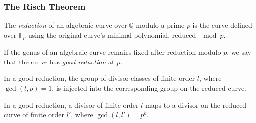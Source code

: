 \documentclass[aspectratio=169,dvipsnames]{beamer}
\begin{document}
\begin{frame}
\frametitle{The Risch Theorem}
\begin{definition}
The {\it reduction} of an algebraic curve over $\mathbb{Q}$ modulo a prime $p$
is the curve defined over $\mathbb{F}_p$ using the original curve's minimal
polynomial, reduced $\mod p$.
\end{definition}

\begin{definition}
If the genus of an algebraic curve remains fixed after reduction modulo $p$,
we say that the curve has {\it good reduction} at $p$.
\end{definition}

\begin{theorem}[Risch]
In a good reduction, the group of divisor classes of finite order $l$,
where $\gcd(l,p)=1$, is injected into the corresponding group on the
reduced curve.
\end{theorem}

\begin{corollary}
In a good reduction, a divisor of finite order $l$ maps to a
divisor on the reduced curve of finite order $l'$, where $\gcd(l,l') = p^k$.
\end{corollary}
\end{frame}

\begin{comment}

\begin{frame}[fragile]
\frametitle{Chebyshev's Integral (cont)}

\begin{sageblock}[chebyshev2]
PP.<x,y,z> = ProjectiveSpace(QQ, 2)
root = x^4+4*x^3+2*x^2+1
C = Curve((y^2-root).homogenize(z))
C.geometric_genus()
\end{sageblock}

\begin{sageblock}[chebyshev2]
PP.<x,y,z> = ProjectiveSpace(GF(2), 2)
C = Curve((y^2-root.change_ring(GF(2))).homogenize(z))
C.geometric_genus()
\end{sageblock}

\end{frame}

\begin{frame}[fragile]
\frametitle{Chebyshev's Integral (cont)}

\begin{sageblock}[chebyshev2]
PP.<x,y,z> = ProjectiveSpace(GF(3), 2)
C = Curve((y^2-root.change_ring(GF(3))).homogenize(z))
C.geometric_genus()
\end{sageblock}

\begin{sageblock}[chebyshev2]
PP.<x,y,z> = ProjectiveSpace(GF(5), 2)
C = Curve((y^2-root.change_ring(GF(5))).homogenize(z))
C.geometric_genus()
\end{sageblock}

\end{frame}

\end{comment}
\end{document}
